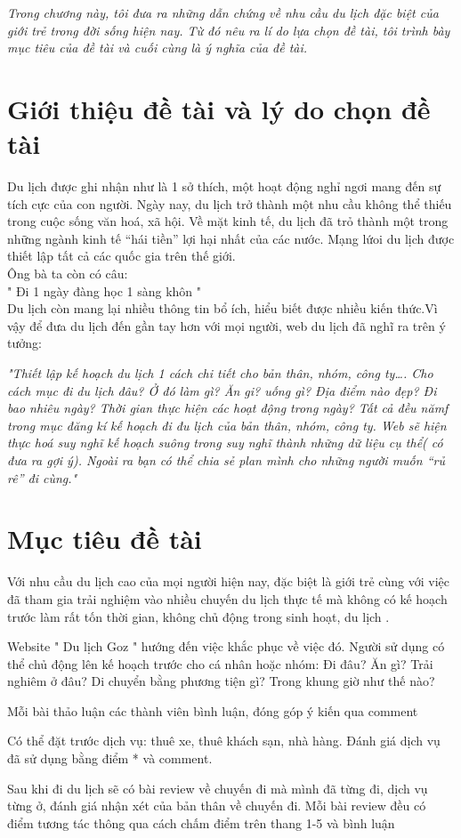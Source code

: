 \par{\textit{Trong chương này, tôi đưa ra những dẫn chứng về nhu cầu du lịch đặc biệt của giới trẻ trong đời sống hiện nay. Từ đó nêu ra lí do lựa chọn đề tài, tôi trình bày mục tiêu của đề tài và cuối cùng là ý nghĩa của đề tài.}}

\section{Giới thiệu đề tài và lý do chọn đề tài}
Du lịch được ghi nhận như là 1 sở thích, một hoạt động nghỉ ngơi mang đến sự tích cực của con người. Ngày nay, du lịch trở thành một nhu cầu không thể thiếu trong cuộc sống văn hoá, xã hội. Về mặt kinh tế, du lịch đã trỏ thành một trong những ngành kinh tế “hái tiền” lợi hại nhất của các nước. Mạng lứoi du lịch được thiết lập tất cả các quốc gia trên thế giới. \\
Ông bà ta còn có câu: \\
"	Đi 1 ngày đàng học 1 sàng khôn  "\\
Du lịch còn mang lại nhiều thông tin bổ ích, hiểu biết được nhiều kiến thức.Vì vậy để đưa du lịch đến gần tay hơn với mọi người, web du lịch đã nghĩ ra trên ý tưởng:\\
\par{\textit{"Thiết lập kế hoạch du lịch 1 cách chi tiết cho bản thân, nhóm, công ty…. Cho cách mục đi du lịch đâu? Ở đó làm gì? Ăn gi? uống gì? Địa điểm nào đẹp? Đi bao nhiêu ngày? Thời gian thực hiện các hoạt động trong ngày?  Tất cả đều nămf trong mục đăng kí kế hoạch đi đu lịch của bản thân, nhóm, công ty. Web sẽ hiện thực hoá suy nghĩ kế hoạch suông trong suy nghĩ thành những dữ liệu cụ thể( có đưa ra gợi ý). Ngoài ra bạn có thể chia sẻ plan mình cho những người muốn “rủ rê” đi cùng."}}

\section{Mục tiêu đề tài}
Với nhu cầu du lịch cao của mọi người hiện nay, đặc biệt là giới trẻ cùng với việc đã tham gia trải nghiệm  vào nhiều chuyến du lịch thực tế mà không có kế hoạch trước làm rất tốn thời gian, không chủ động trong sinh hoạt, du lịch .
\par{Website " Du lịch Goz " hướng đến việc khắc phục về việc đó. Người sử dụng có thể chủ động lên kế hoạch trước cho cá nhân hoặc nhóm: Đi đâu? Ăn gì? Trải nghiêm ở đâu? Di chuyển bằng phương tiện gì? Trong khung giờ như thế nào? }

\par{Mỗi bài thảo luận các thành viên bình luận, đóng góp ý kiến qua comment}
\par{Có thể đặt trước dịch vụ: thuê xe, thuê khách sạn, nhà hàng. Đánh giá dịch vụ đã sử dụng bằng điểm * và comment.}
\par{Sau khi đi du lịch sẽ có bài review về chuyến đi mà mình đã từng đi, dịch vụ từng ở, đánh giá nhận xét của bản thân về chuyến đi. Mỗi bài review đều có điểm tương tác thông qua cách chấm điểm trên thang 1-5 và bình luận}






